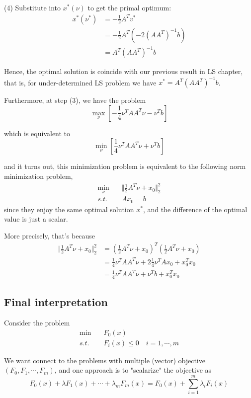 \begin{example}
	(4) Substitute into $x^*(\nu)$ to get the primal optimum:
	\begin{align*}
	x^*(\nu^*) 
	&=-\frac{1}{2} A^T v^* \\
	&= -\frac{1}{2}A^T(-2(AA^T)^{-1}b)\\
	&= A^T(AA^T)^{-1}b
	\end{align*}

Hence, the optimal solution is coincide with our previous result in LS chapter, that is, for under-determined LS problem we have $x^* = A^T(AA^T)^{-1}b$.

Furthermore, at step (3), we have the problem
$$\max_{\nu} [- \frac{1}{4}\nu^TAA^T\nu - \nu^Tb ]$$

which is equivalent to 
$$\min_{\nu} [\frac{1}{4}\nu^TAA^T\nu + \nu^Tb ]$$

and it turns out, this minimization problem is equivalent to the following norm minimization problem,
\begin{align*}
\min_\nu\quad & \Vert\frac{1}{2}A^T\nu + x_0\Vert^2_2\\
s.t.\quad & Ax_0 = b 
\end{align*}
since they enjoy the same optimal solution $x^*$, and the difference of the optimal value is just a scalar.

More precisely, that's because
\begin{align*}
	\Vert \frac{1}{2}A^T\nu + x_0\Vert_2^2 
	&= (\frac{1}{2}A^T\nu+x_0)^T(\frac{1}{2}A^T\nu+x_0)\\
	&= \frac{1}{4}\nu^TAA^T\nu + 2\frac{1}{4}\nu^TAx_0 + x_0^Tx_0\\
	&= \frac{1}{4}\nu^TAA^T\nu + \nu^Tb+x_0^Tx_0
\end{align*}

\end{example}


\subsection{Final interpretation}
Consider the problem
\begin{align*}
	\min \quad & F_0(x)\\
	s.t. \quad & F_i(x)\leq 0\quad i = 1,\cdots,m
\end{align*}

We want connect to the problems with multiple (vector) objective $(F_0,F_1,\cdots,F_m)$, and one approach is to "scalarize" the objective as 
\begin{equation*}
	F_0(x) + \lambda F_1(x) + \cdots + \lambda_mF_m(x) = F_0(x) + \sum^m_{i=1}\lambda_iF_i(x)
\end{equation*}

